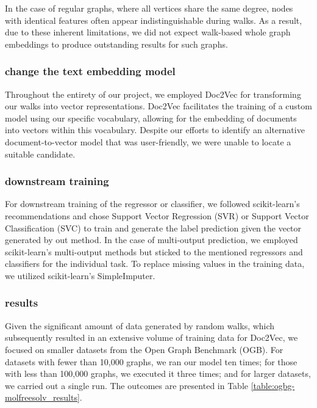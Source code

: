 In the case of regular graphs, where all vertices share the same degree, nodes with identical features often appear indistinguishable during walks. As a result, due to these inherent limitations, we did not expect walk-based whole graph embeddings to produce outstanding results for such graphs.

\subsubsection{change the text embedding model}
Throughout the entirety of our project, we employed Doc2Vec\cite{2014doc2vec} for transforming our walks into vector representations. Doc2Vec facilitates the training of a custom model using our specific vocabulary, allowing for the embedding of documents into vectors within this vocabulary. Despite our efforts to identify an alternative document-to-vector model that was user-friendly, we were unable to locate a suitable candidate.




\subsubsection{downstream training}
For downstream training of the regressor or classifier, we followed scikit-learn's recommendations and chose Support Vector Regression (SVR) or Support Vector Classification (SVC) to train and generate the label prediction given the vector generated by out method. In the case of multi-output prediction, we employed scikit-learn's multi-output methods but sticked to the mentioned regressors and classifiers for the individual task. To replace missing values in the training data, we utilized scikit-learn's SimpleImputer.

\subsubsection{results}
Given the significant amount of data generated by random walks, which subsequently resulted in an extensive volume of training data for Doc2Vec, we focused on smaller datasets from the Open Graph Benchmark (OGB). For datasets with fewer than 10,000 graphs, we ran our model ten times; for those with less than 100,000 graphs, we executed it three times; and for larger datasets, we carried out a single run. The outcomes are presented in Table \ref{table:ogbg-molfreesolv_results}.


